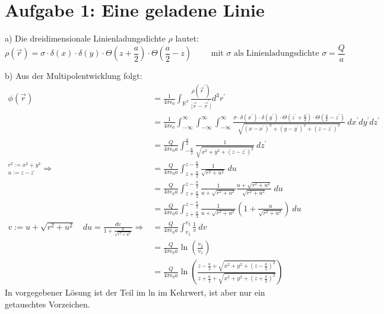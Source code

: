 \documentclass[11pt a4paper]{article}
\newcommand{\epsz}{\epsilon_0}
\newcommand{\kco}{\frac{1}{4\pi\epsilon_0}}
\begin{document}
\thispagestyle{fancy}
\section*{Aufgabe 1: Eine geladene Linie}
\par{a)}
Die dreidimensionale Linienladungsdichte $\rho$ lautet:
\[
	\rho(\vec r) =
	\sigma \cdot \delta(x) \cdot \delta(y) \cdot 
	\Theta\left( z + \frac a 2 \right)
	\cdot \Theta\left(\frac a 2 - z\right)
	\qquad \text{ mit } \sigma \text{ als Linienladungsdichte }
	\sigma = \frac Q a
\]

\par{b)}
Aus der Multipolentwicklung folgt:
\begin{align*}
	\phi (\vec r) 
	&= \kco 
	\int_{\mathbb{R}^3} \frac{\rho(\vec r^\prime)}
	{\vert \vec r - \vec r^\prime \vert} 
	d^3r^\prime \\
	&= \kco
	\int_{-\infty}^\infty
	\int_{-\infty}^\infty
	\int_{-\infty}^\infty
	\frac{
	\sigma \cdot \delta(x^\prime) \cdot \delta(y^\prime) \cdot 
	\Theta\left( z^\prime + \frac a 2 \right)
	\cdot \Theta\left(\frac a 2 - z^\prime \right)}
	{\sqrt{(x-x^\prime)^2 + (y-y^\prime)^2 + (z-z^\prime)^2}} \
	dx^\prime dy^\prime dz^\prime\\
	&= \frac{Q}{4\pi\epsz a} \int_{-\frac a 2}^{\frac a 2}
	\frac1{\sqrt{x^2 + y^2 + (z-z^\prime)^2}} \ dz^\prime \\
	^{r^2 := x^2 + y^2}
	_{u := z - z^\prime}
	\Rightarrow
	&= \frac{Q}{4\pi\epsz a} \int_{z+\frac a 2}^{z-\frac a 2}
	\frac1{\sqrt{r^2 + u^2}} \ du \\
	&= \frac{Q}{4\pi\epsz a} \int_{z+\frac a 2}^{z-\frac a 2}
	\frac{1}{u + \sqrt{r^2 + u^2}}
	\frac{u + \sqrt{r^2 + u^2}}{\sqrt{r^2 + u^2}} 
	\ du \\
	&= \frac{Q}{4\pi\epsz a} \int_{z+\frac a 2}^{z-\frac a 2}
	\frac{1}{u + \sqrt{r^2 + u^2}}
	\left( 1 + \frac{u}{\sqrt{r^2 + u^2}} \right)
	\ du \\
	v:= u+\sqrt{r^2 + u^2} \quad
	du = \frac{dv}{1 + \frac{u}{\sqrt{r^2 + u^2}}}
	\Rightarrow
	&= \frac{Q}{4\pi\epsz a} \int_{v_1}^{v_2}
	\frac{1}{v}
	\ dv \\
	&= \frac{Q}{4\pi\epsz a}
	\ln \left( \frac{v_2}{v_1} \right) \\
	&= \frac{Q}{4\pi\epsz a}
	\ln \left( \frac{
		z-\frac a 2 + \sqrt{x^2 + y^2 + \left(z-\frac a 2\right)^2}}
	{
		z+\frac a 2 + \sqrt{x^2 + y^2 + \left(z+\frac a 2\right)^2}}
	\right)
\end{align*}
In vorgegebener Lösung ist der Teil im ln im Kehrwert, ist aber nur ein 
getauschtes Vorzeichen.
\end{document}
